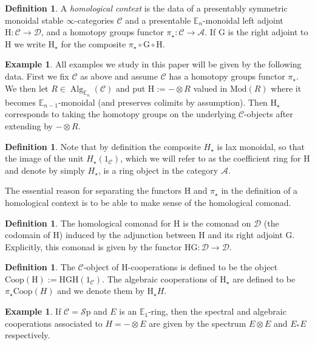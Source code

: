 \documentclass[10pt]{amsart}
\theoremstyle{definition}
\numberwithin{figure}{section}
\numberwithin{equation}{section}
\newtheorem{definition}[figure]{Definition}
\newtheorem{example}[figure]{Example}
\newcommand{\cA}{\mathcal{A}}
\newcommand{\cC}{\mathcal{C}}
\newcommand{\cD}{\mathcal{D}}
\newcommand{\one}{\mathrm{1}}
\theoremstyle{cited}
\newcommand{\bE}{\mathbb{E}}
\newcommand{\Alg}{\operatorname{Alg}}
\newcommand{\Sp}{{\mathcal{S}\mathrm{p}}}
\newcommand{\Mod}{\mathrm{Mod}}
\renewcommand{\H}{\mathrm{H}}
\newcommand{\G}{\mathrm{G}}
\newcommand{\Coop}{\mathrm{Coop}}
\begin{document}
\begin{definition}
  \label{def:homcontext}
  A \textit{homological context} is the data of a presentably symmetric monoidal  stable $\infty$-categories $\cC$ and a presentable $\bE_n$-monoidal left adjoint $\H:\cC\to \cD$, and a homotopy groups functor $\pi_\star:\cC\to \cA$. If $\G$ is the right adjoint to $\H$ we write $\H_\star$ for the composite $\pi_\star\circ \G\circ \H$.
\end{definition}

\begin{example}
  All examples we study in this paper will be given by the following data. First we fix $\cC$ as above and assume $\cC$ has a homotopy groups functor $\pi_\star$. We then let $R\in \Alg_{\bE_n}(\cC)$ and put $\H:=-\otimes R$ valued in $\Mod(R)$ where it becomes $\bE_{n-1}$-monoidal (and preserves colimits by assumption). Then $\H_\star$ corresponds to taking the homotopy groups on the underlying $\cC$-objects after extending by $-\otimes R$.
\end{example}

\begin{definition}
  Note that by definition the composite $H_\star$ is lax monoidal, so that the image of the unit $H_\star(\one_{\cC})$, which we will refer to as the coefficient ring for $\H$ and denote by simply $H_\star$, is a ring object in the category $\cA$.
\end{definition}

The essential reason for separating the functors $\H$ and $\pi_\star$ in the definition of a homological context is to be able to make sense of the homological comonad.

\begin{definition}
  The homological comonad for $\H$ is the comonad on $\cD$ (the codomain of $\H$) induced by the adjunction between $\H$ and its right adjoint $\G$. Explicitly, this comonad is given by the functor $\H\G: \cD\to \cD$. 
\end{definition}

\begin{definition}
  The $\cC$-object of $\H$-cooperations is defined to be the object $\Coop(\H):=\H\G\H(\one_{\cC})$. The algebraic cooperations of $\H_\star$ are defined to be $\pi_\star\Coop(H)$ and we denote them by $\H_\star H$.
\end{definition}

\begin{example}
  If $\cC=\Sp$ and $E$ is an $\bE_1$-ring, then the spectral and algebraic cooperations associated to $H=-\otimes E$ are given by the spectrum $E\otimes E$ and $E_*E$ respectively.
\end{example}
\end{document}
